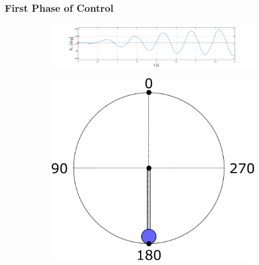 \documentclass[]{beamer}
\begin{document}
\begin{frame}
	\frametitle{First Phase of Control}
	\begin{figure}[H]
		\centering
		\begin{subfigure}
			\centering
			\includegraphics[scale=0.25]{images/swings2/swing1.pdf}  
		\end{subfigure}
		\begin{subfigure}
			\centering
			\includegraphics[scale=0.25]{images/swing0.pdf}  
		\end{subfigure}
	\end{figure}
\end{frame}
\end{document}
